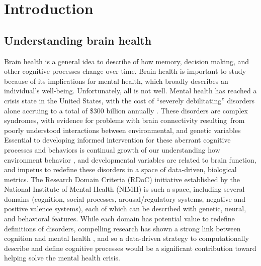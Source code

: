 \documentclass{report}
\begin{document}
\afterpreface

\chapter{Introduction}

\section{Understanding brain health}

Brain health is a general idea to describe of how memory, decision making, and other cognitive processes change over time. Brain health is important to study because of its implications for mental health, which broadly describes an individual's well-being. Unfortunately, all is not well.
Mental health has reached a crisis state in the United States, with the
cost of ``severely debilitating'' disorders alone accruing to a total of
\$300 billion annually \cite{noauthor_undated-ou}.
These disorders are complex syndromes, with evidence for problems with
brain connectivity \cite{Horwitz2012-ci,Fornito2015-rv}
resulting~from poorly understood interactions between environmental, and
genetic variables \cite{McCarroll2013-hi}
Essential to developing informed intervention for these aberrant
cognitive processes and behaviors is continual growth of our
understanding how environment \cite{DeWit2000-wh}
behavior \cite{Schmidt2007-cs},
and developmental variables \cite{Broman1999-dq,Ten_Donkelaar2014-ps} are
related to brain function, and impetus to redefine these disorders in a space of data-driven, biological metrics. The Research Domain Criteria (RDoC) initiative \cite{Insel2009-vi} established by the National Institute of Mental Health (NIMH) is such a space, including several domains (cognition, social processes, arousal/regulatory systems, negative and positive valence systems), each of which can be described with genetic, neural, and behavioral features. While each domain has potential value to redefine definitions of disorders, compelling research has shown a strong link between cognition and mental health \cite{Etkin2013-lo}, and so a data-driven strategy to computationally describe and define cognitive processes would be a significant contribution toward helping solve the mental health crisis.
\end{document}
